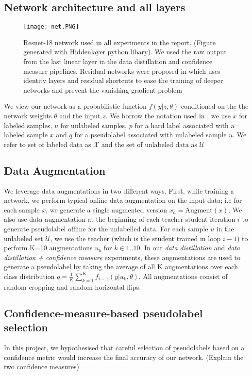 \documentclass{article}
\begin{document}
\subsection{Network architecture and all layers}
\begin{figure}[H]
    \centering
    \texttt{[image: net.PNG]}
    \caption{Resnet-18 network used in all experiments in the report. (Figure generated with Hiddenlayer python libary). We used the raw output from the last linear layer in the data distillation and confidence measure pipelines. Residual networks were proposed in  which uses identity layers and residual shortcuts to ease the training of deeper networks and prevent the vanishing gradient problem} 
    \label{fig:my_label}
\end{figure}
We view our network as a probabilistic function $f(y | z, \theta)$ conditioned on the the network weights $\theta$ and the input $z$. We borrow the notation used in \cite{Berthelot2019MixMatch:Learning}, we use $x$ for labeled samples, $u$ for unlabeled samples, $p$ for a hard label associated with a labeled sample $x$ and $q$ for a pseudolabel associated with unlabeled sample $u$. We refer to set of labeled data as $\mathcal{X}$ and the set of unlabeled data as $\mathcal{U}$
\subsection{Data Augmentation}
We leverage data augmentations in two different ways. First, while training a network, we perform typical online data augmentation on the input data; i.e for each  sample $x$, we generate a single augmented version $x_{a}=\text{Augment}(x)$. We also use data augmentation at the beginning of each teacher-student iteration $i$ to generate pseudolabel offline for the unlabelled data.  For each sample $u$ in the unlabeled set $\mathcal{U}$, we use the teacher (which is the student trained in loop $i-1$) to perform K=10 augmentations $u_{k}$ for $k \in 1..10$. In our \textit{data distillation} and \textit{data distillation + confidence measure} experiments, these augmentations are used to generate a pseudolabel by taking the average of all K augmentations over each class distribution $q = \frac{1}{K} \sum_{k=1}^{K} f_{i-1}(y | u_{k}, \theta)$. All augmentations consist of random cropping and random horizontal flips.
\subsection{Confidence-measure-based pseudolabel selection}
In this project, we hypothesised that careful selection of pseudolabels based on a confidence metric would increase the final accuracy of our network. (Explain the two confidence measures)
\end{document}
